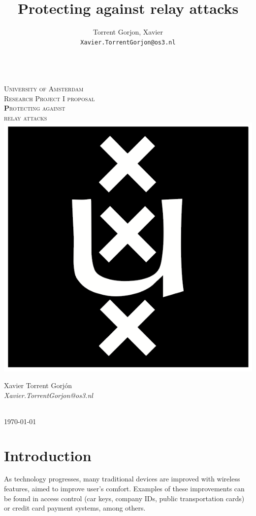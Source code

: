 \documentclass{article}
\author{
  Torrent Gorjon, Xavier\\
  \texttt{Xavier.TorrentGorjon@os3.nl}
}
\title{Protecting against relay attacks}
\begin{document}
\begin{titlepage}
\center
\textsc{}\\[1cm]
\textsc{\LARGE University of Amsterdam}\\[1.5cm]

\textsc{\Large Research Project I proposal}\\[0.5cm]

\textsc{\Huge \textbf Protecting against\\relay attacks}\\[1.5cm]

\includegraphics[scale=1]{images/uva.png}\\[1cm]

\begin{minipage}{0.5 \textwidth}
\begin{center} \large
Xavier Torrent Gorj\'{o}n\\
\emph{Xavier.TorrentGorjon@os3.nl}\\[0.5cm]
\end{center}
\end{minipage}\\[2cm]
{\large \today} 


\end{titlepage}


\newpage

\tableofcontents
\section{Introduction}
As technology progresses, many traditional devices are improved with wireless features, aimed to improve user's comfort. Examples of these improvements can be found in access control (car keys, company IDs, public transportation cards) or credit card payment systems, among others.
\end{document}
